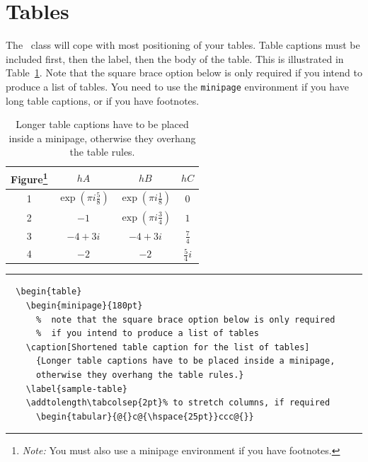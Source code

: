 \section{Tables}
The \cambridge\ class will cope with most positioning of your tables.
Table captions must be included first, then the label, then the body of the table.
This is illustrated in Table~\ref{sample-table}.
Note that the square brace option below is only required
if you intend to produce a list of tables. You need to use the \verb"minipage"
environment if you have long table captions, or if you have footnotes.

  \begin{table}
    \begin{minipage}{180pt}
    \caption[Shortened table caption for the list of tables]
      {Longer table captions have to be placed inside a minipage,
      otherwise they overhang the table rules.}
    \label{sample-table}
    \addtolength\tabcolsep{2pt}%
      \begin{tabular}{@{}c@{\hspace{25pt}}ccc@{}}
        \hline \hline
        Figure\footnote{\textit{Note:} You must also use a minipage
          environment if you have footnotes.} & $hA$ & $hB$ & $hC$\\
        \hline
        1 & $\exp\left(\pi i\frac58\right)$
          & $\exp\left(\pi i\frac18\right)$ & $0$\\[3pt]
        2 & $-1$    & $\exp\left(\pi i\frac34\right)$ & $1$\\[10pt]
        3 & $-4+3i$ & $-4+3i$ & $\frac74$\\[3pt]
        4 & $-2$    & $-2$    & $\frac54 i$ \\
        \hline \hline
      \end{tabular}
    \end{minipage}
    \rule[-20pt]{\textwidth}{0.5pt}
\begin{verbatim}
  \begin{table}
    \begin{minipage}{180pt}
      %  note that the square brace option below is only required
      %  if you intend to produce a list of tables
    \caption[Shortened table caption for the list of tables]
      {Longer table captions have to be placed inside a minipage,
      otherwise they overhang the table rules.}
    \label{sample-table}
    \addtolength\tabcolsep{2pt}% to stretch columns, if required
      \begin{tabular}{@{}c@{\hspace{25pt}}ccc@{}}

\end{verbatim}
\end{table}
